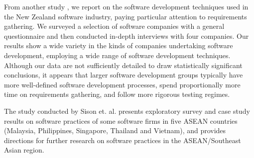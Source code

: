 From another study \citep{Groves2000}, we report on the software development techniques used in the New Zealand software industry, paying particular attention to requirements gathering. We surveyed a selection of software companies with a general questionnaire and then conducted in-depth interviews with four companies. Our results show a wide variety in the kinds of companies undertaking software development, employing a wide range of software development techniques. Although our data are not sufficiently detailed to draw statistically significant conclusions, it appears that larger software development groups typically have more well-defined software development processes, spend proportionally more time on requirements gathering, and follow more rigorous testing regimes.

The study conducted by Sison et. al. \citep{Sison2006} presents exploratory survey and case study results on software practices of some software firms in five ASEAN countries (Malaysia, Philippines, Singapore, Thailand and Vietnam), and provides directions for further research on software practices in the ASEAN/Southeast Asian region.